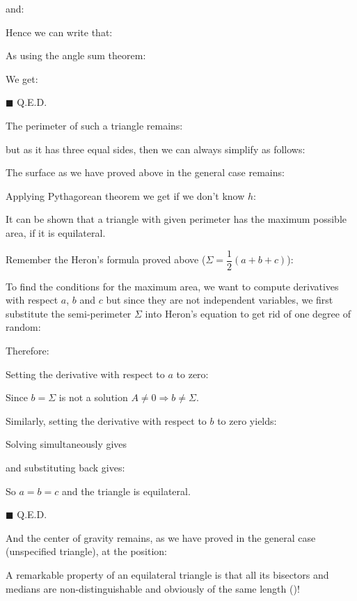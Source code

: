 {\begin{dem}
	and:
	
	Hence we can write that:
	
	As using the angle sum theorem:
	
	We get:
	
	\begin{flushright}
		$\blacksquare$  Q.E.D.
	\end{flushright}
	\end{dem} 
	The perimeter of such a triangle remains:
	
	but as it has three equal sides, then we can always simplify as follows:
	
	The surface as we have proved above in the general case remains:
	
	Applying Pythagorean theorem we get if we don't know $h$:
	
	It can be shown that a triangle with given perimeter has the maximum possible area, if it is equilateral.
	\begin{dem}
	Remember the Heron's formula proved above ($\Sigma=\dfrac{1}{2}(a+b+c)$):
	
	To find the conditions for the maximum area, we want to compute derivatives with respect $a$, $b$ and $c$ but since they are not independent variables, we first substitute the semi-perimeter $\Sigma$ into Heron's equation to get rid of one degree of random:
	
	Therefore:
	
	Setting the derivative with respect to $a$ to zero:
	
	Since $b=\Sigma$ is not a solution $A\neq 0\Rightarrow b\neq \Sigma$.
	
	Similarly, setting the derivative with respect to $b$ to zero yields:
	
	Solving simultaneously gives
	
	and substituting back gives:
	
	So $a=b=c$ and the triangle is equilateral.
	\begin{flushright}
		$\blacksquare$  Q.E.D.
	\end{flushright}
	\end{dem}
	And the center of gravity remains, as we have proved in the general case (unspecified triangle), at the position:
	
	A remarkable property of an equilateral triangle is that all its bisectors and medians are non-distinguishable and obviously of the same length ()!
	
}
